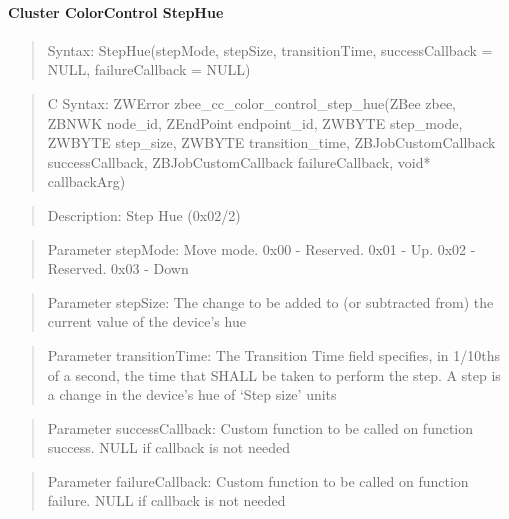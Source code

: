 \paragraph{Cluster ColorControl StepHue}
\begin{quote}Syntax: StepHue(stepMode, stepSize, transitionTime, successCallback = NULL, failureCallback = NULL)\end{quote}
\begin{quote}C Syntax: ZWError zbee\_cc\_color\_control\_step\_hue(ZBee zbee, ZBNWK node\_id, ZEndPoint endpoint\_id, ZWBYTE step\_mode, ZWBYTE step\_size, ZWBYTE transition\_time, ZBJobCustomCallback successCallback, ZBJobCustomCallback failureCallback, void* callbackArg)\end{quote}
\begin{quote}Description: Step Hue (0x02/2)\end{quote}
\begin{quote}Parameter stepMode: Move mode. 0x00 - Reserved. 0x01 - Up. 0x02 - Reserved. 0x03 - Down\end{quote}
\begin{quote}Parameter stepSize: The change to be added to (or subtracted from) the current value of the device’s hue\end{quote}
\begin{quote}Parameter transitionTime: The Transition Time field specifies, in 1/10ths of a second, the time that SHALL be taken to perform the step. A step is a change in the device’s hue of ‘Step size’ units\end{quote}
\begin{quote}Parameter successCallback: Custom function to be called on function success. NULL if callback is not needed\end{quote}
\begin{quote}Parameter failureCallback: Custom function to be called on function failure. NULL if callback is not needed\end{quote}


